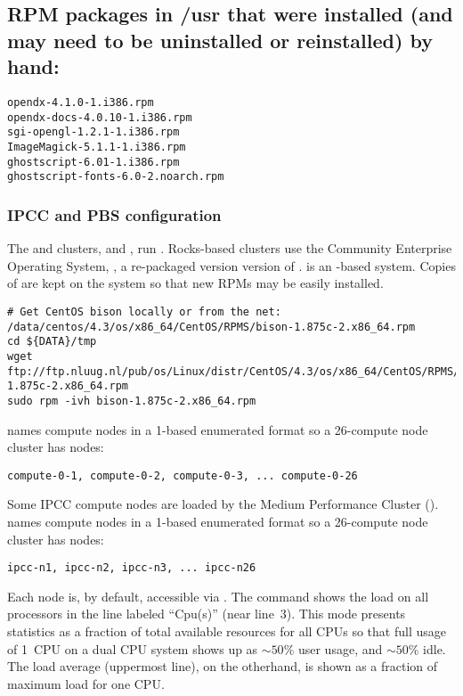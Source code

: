 \documentclass[12pt,twoside]{article}
\begin{document}
\subsection{RPM packages in /usr that were installed (and may need to be uninstalled or reinstalled) by hand: }\label{sxn:nst2}
\begin{verbatim}
opendx-4.1.0-1.i386.rpm
opendx-docs-4.0.10-1.i386.rpm
sgi-opengl-1.2.1-1.i386.rpm
ImageMagick-5.1.1-1.i386.rpm
ghostscript-6.01-1.i386.rpm
ghostscript-fonts-6.0-2.noarch.rpm
\end{verbatim}

\subsubsection{IPCC and PBS configuration}\label{sxn:ipcc}
The  and  clusters,
 and , run
. 
Rocks-based clusters use the Community Enterprise Operating System,
, a re-packaged version version of . 
 is an -based system.
Copies of  are kept on the system so that new RPMs
may be easily installed.
\begin{verbatim}
# Get CentOS bison locally or from the net:
/data/centos/4.3/os/x86_64/CentOS/RPMS/bison-1.875c-2.x86_64.rpm
cd ${DATA}/tmp
wget ftp://ftp.nluug.nl/pub/os/Linux/distr/CentOS/4.3/os/x86_64/CentOS/RPMS/bison-1.875c-2.x86_64.rpm
sudo rpm -ivh bison-1.875c-2.x86_64.rpm
\end{verbatim}
 names compute nodes in a 1-based enumerated format so a
26-compute node cluster has nodes:
\begin{verbatim}
compute-0-1, compute-0-2, compute-0-3, ... compute-0-26
\end{verbatim}
Some IPCC compute nodes are loaded by the Medium Performance Cluster
(). 
 names compute nodes in a 1-based enumerated format so a
26-compute node cluster has nodes:
\begin{verbatim}
ipcc-n1, ipcc-n2, ipcc-n3, ... ipcc-n26
\end{verbatim}
Each node is, by default, accessible via .
The  command shows the load on all processors in the
line labeled ``Cpu(s)'' (near line~3).
This mode presents statistics as a fraction of total available
resources for all CPUs so that full usage of 1~CPU on a dual CPU
system shows up as $\sim 50$\% user usage, and $\sim 50$\% idle.
The load average (uppermost line), on the otherhand, is shown as
a fraction of maximum load for one CPU.
\end{document}
